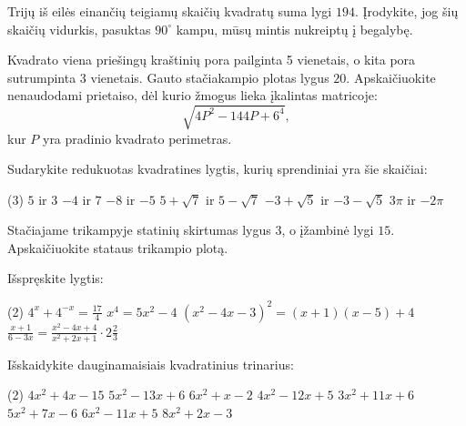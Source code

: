 \documentclass[12pt, a4paper]{scrartcl}
\begin{document}
\begin{problem}
Trijų iš eilės einančių teigiamų skaičių kvadratų suma lygi $194$. Įrodykite, jog šių skaičių vidurkis, pasuktas $90^\circ$ kampu, mūsų mintis nukreiptų į begalybę.
\end{problem}

\begin{problem}
Kvadrato viena priešingų kraštinių pora pailginta 5 vienetais, o kita pora sutrumpinta 3 vienetais. Gauto stačiakampio plotas lygus $20$. Apskaičiuokite nenaudodami prietaiso, dėl kurio žmogus lieka įkalintas matricoje:
\[
\sqrt{4P^2-144P+6^4},
\]
kur $P$ yra pradinio kvadrato perimetras.
\end{problem}

\begin{problem}
    Sudarykite redukuotas kvadratines lygtis, kurių sprendiniai yra šie skaičiai:
        \begin{tasks}[label={(\arabic*)}, label-offset=0.9em](3)
        \task $5$ ir $3$ 
        \task $-4$ ir $7$ 
        \task $-8$ ir $-5$
        \task $5+ \sqrt{7} $ ir $5- \sqrt{7}$
        \task $-3+ \sqrt{5} $ ir $-3- \sqrt{5}$
        \task $3\pi$ ir $-2\pi$  
    \end{tasks}
\end{problem}

\begin{problem}
    Stačiajame trikampyje statinių skirtumas lygus $3$, o įžambinė lygi $15$. Apskaičiuokite stataus trikampio plotą.
\end{problem}

\begin{problem}
    Išspręskite lygtis:
        \begin{tasks}[label={(\arabic*)}, label-offset=0.9em](2)
        \task $4 ^{x}+4 ^{-x} = \frac{17}{4}  $
        \task $x ^{4} = 5 x ^{2} -4 $
        \task $(x ^{2} -4x-3) ^{2} = (x+1)(x-5)+4$
        \task $\frac{x+1}{6-3 x}=\frac{x^2-4 x+4}{x^2+2 x+1} \cdot 2 \frac{2}{3}$    
    \end{tasks}
\end{problem}

\begin{problem}
    Išskaidykite dauginamaisiais kvadratinius trinarius:
    \begin{tasks}[label={(\arabic*)}, label-offset=0.9em](2)
        \task $4x^2 + 4x - 15$
        \task $5x^2 - 13x + 6$
        \task $6x^2 + x - 2$
        \task $4x^2 - 12x + 5$
        \task $3x^2 + 11x + 6$
        \task $5x^2 + 7x - 6$
        \task $6x^2 - 11x + 5$
        \task $8x^2 + 2x - 3$
    \end{tasks}
\end{problem}
\end{document}
